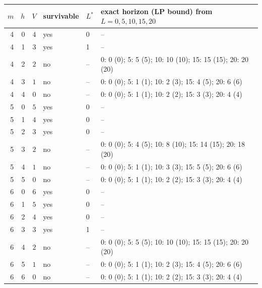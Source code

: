 \begin{tabular}{rrrlll}
\toprule
$m$ & $h$ & $V$ & survivable & $L^\ast$ & exact horizon (LP bound) from $L=0,5,10,15,20$\\
\midrule
4 & 0 & $4$ & yes & 0 & -- \\
4 & 1 & $3$ & yes & 1 & -- \\
4 & 2 & $2$ & no & -- & 0: 0 (0); 5: 5 (5); 10: 10 (10); 15: 15 (15); 20: 20 (20)\\
4 & 3 & $1$ & no & -- & 0: 0 (0); 5: 1 (1); 10: 2 (3); 15: 4 (5); 20: 6 (6)\\
4 & 4 & $0$ & no & -- & 0: 0 (0); 5: 1 (1); 10: 2 (2); 15: 3 (3); 20: 4 (4)\\
5 & 0 & $5$ & yes & 0 & -- \\
5 & 1 & $4$ & yes & 0 & -- \\
5 & 2 & $3$ & yes & 0 & -- \\
5 & 3 & $2$ & no & -- & 0: 0 (0); 5: 4 (5); 10: 8 (10); 15: 14 (15); 20: 18 (20)\\
5 & 4 & $1$ & no & -- & 0: 0 (0); 5: 1 (1); 10: 3 (3); 15: 5 (5); 20: 6 (6)\\
5 & 5 & $0$ & no & -- & 0: 0 (0); 5: 1 (1); 10: 2 (2); 15: 3 (3); 20: 4 (4)\\
6 & 0 & $6$ & yes & 0 & -- \\
6 & 1 & $5$ & yes & 0 & -- \\
6 & 2 & $4$ & yes & 0 & -- \\
6 & 3 & $3$ & yes & 1 & -- \\
6 & 4 & $2$ & no & -- & 0: 0 (0); 5: 5 (5); 10: 10 (10); 15: 15 (15); 20: 20 (20)\\
6 & 5 & $1$ & no & -- & 0: 0 (0); 5: 1 (1); 10: 2 (3); 15: 4 (5); 20: 6 (6)\\
6 & 6 & $0$ & no & -- & 0: 0 (0); 5: 1 (1); 10: 2 (2); 15: 3 (3); 20: 4 (4)\\
\bottomrule
\end{tabular}
